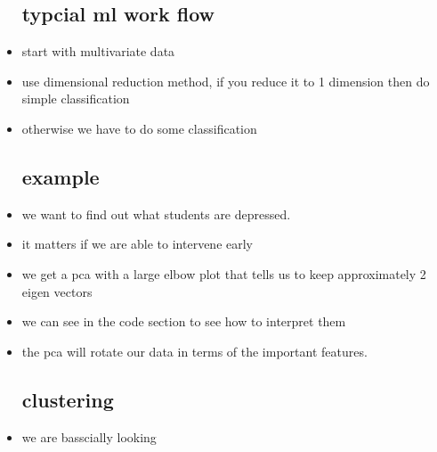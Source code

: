 \documentclass{article}
\begin{document}
\begin{itemize}
\subsection{typcial ml work flow}
\item start with multivariate data
\item use dimensional reduction method, if you reduce it to 1 dimension then do simple classification 
\item otherwise we have to do some classification \subsection{example}
\item we want to find out what students are depressed.
\item it matters if we are able to intervene early
\item we get a pca with a large elbow plot that tells us to keep approximately 2 eigen vectors 
\item we can see in the code section to see how to interpret them 
\item the pca will rotate our data in terms of the important features.
\subsection{clustering}
\item we are basscially looking 
\end{itemize}
\end{document}
